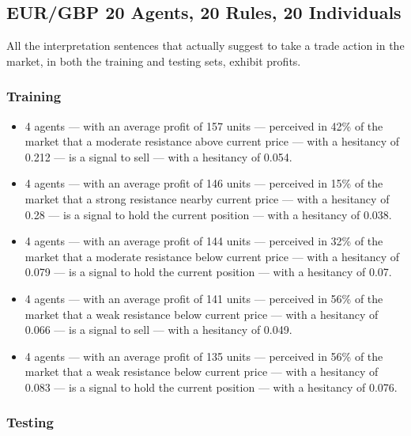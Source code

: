 \subsection{EUR/GBP 20 Agents, 20 Rules, 20 Individuals}
\label{}

All the interpretation sentences that actually suggest to take a trade action in
the market, in both the training and testing sets, exhibit profits.

\subsubsection{Training}
\label{}

{\small
  \begin{itemize}
  \item 4 agents — with an average profit of 157 units — perceived in 42\% of
    the market that a moderate resistance above current price — with a hesitancy
    of 0.212 — is a signal to sell — with a hesitancy of 0.054.
  \item 4 agents — with an average profit of 146 units — perceived in 15\% of
    the market that a strong resistance nearby current price — with a hesitancy
    of 0.28 — is a signal to hold the current position — with a hesitancy of
    0.038.
  \item 4 agents — with an average profit of 144 units — perceived in 32\% of
    the market that a moderate resistance below current price — with a hesitancy
    of 0.079 — is a signal to hold the current position — with a hesitancy of
    0.07.
  \item 4 agents — with an average profit of 141 units — perceived in 56\% of
    the market that a weak resistance below current price — with a hesitancy of
    0.066 — is a signal to sell — with a hesitancy of 0.049.
  \item 4 agents — with an average profit of 135 units — perceived in 56\% of
    the market that a weak resistance below current price — with a hesitancy of
    0.083 — is a signal to hold the current position — with a hesitancy of
    0.076.
  \end{itemize}
}

\subsubsection{Testing}
\label{}

